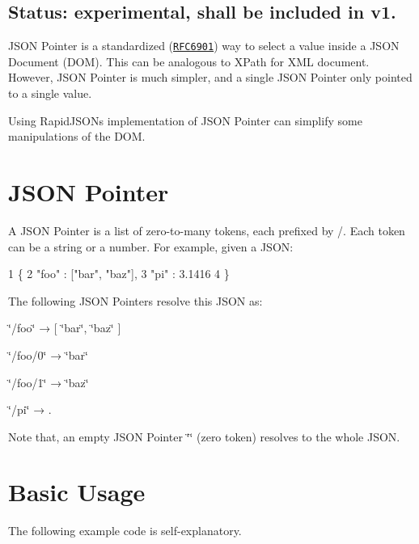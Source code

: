 \subsection*{Status\+: experimental, shall be included in v1.}

J\+S\+ON Pointer is a standardized (\href{https://tools.ietf.org/html/rfc6901}{\tt R\+F\+C6901}) way to select a value inside a J\+S\+ON Document (D\+OM). This can be analogous to X\+Path for X\+ML document. However, J\+S\+ON Pointer is much simpler, and a single J\+S\+ON Pointer only pointed to a single value.

Using Rapid\+J\+S\+ON\textquotesingle{}s implementation of J\+S\+ON Pointer can simplify some manipulations of the D\+OM.\hypertarget{md_Cadriciel_Commun_Externe_RapidJSON_doc_pointer_JsonPointer}{}\section{J\+S\+O\+N Pointer}\label{md_Cadriciel_Commun_Externe_RapidJSON_doc_pointer_JsonPointer}
A J\+S\+ON Pointer is a list of zero-\/to-\/many tokens, each prefixed by {\ttfamily /}. Each token can be a string or a number. For example, given a J\+S\+ON\+: 
\begin{DoxyCode}
1 \{
2     "foo" : ["bar", "baz"],
3     "pi" : 3.1416
4 \}
\end{DoxyCode}


The following J\+S\+ON Pointers resolve this J\+S\+ON as\+:


\begin{DoxyEnumerate}
\item {\ttfamily \char`\"{}/foo\char`\"{}} → {\ttfamily \mbox{[} \char`\"{}bar\char`\"{}, \char`\"{}baz\char`\"{} \mbox{]}}
\item {\ttfamily \char`\"{}/foo/0\char`\"{}} → {\ttfamily \char`\"{}bar\char`\"{}}
\item {\ttfamily \char`\"{}/foo/1\char`\"{}} → {\ttfamily \char`\"{}baz\char`\"{}}
\item {\ttfamily \char`\"{}/pi\char`\"{}} → {.}
\end{DoxyEnumerate}

Note that, an empty J\+S\+ON Pointer {\ttfamily \char`\"{}\char`\"{}} (zero token) resolves to the whole J\+S\+ON.\hypertarget{md_Cadriciel_Commun_Externe_RapidJSON_doc_pointer_BasicUsage}{}\section{Basic Usage}\label{md_Cadriciel_Commun_Externe_RapidJSON_doc_pointer_BasicUsage}
The following example code is self-\/explanatory.


